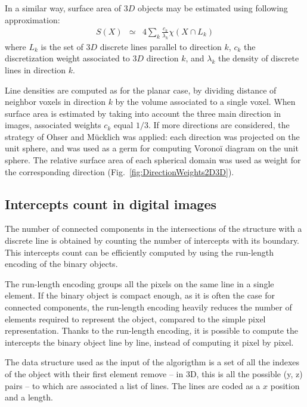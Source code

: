 \documentclass{InsightArticle}
\begin{document}
In a similar way, surface area of $3D$ objects may be estimated using following approximation:
\begin{eqnarray}
S(X) & \simeq & 4\sum_{k}\frac{c_{k}}{\lambda_{k}}\chi \left( X \cap L_{k} \right)
\end{eqnarray}
where $L_k$ is the set of $3D$ discrete lines parallel to direction $k$, 
$c_k$ the discretization weight associated to $3D$ direction $k$, 
and $\lambda_k$ the density of discrete lines in direction $k$.

Line densities are computed as for the planar case, by dividing distance of neighbor
voxels in direction $k$ by the volume associated to a single voxel.
When surface area is estimated by taking into account the three main direction in images, 
associated weights $c_k$ equal $1/3$. If more directions are considered, the strategy of
Ohser and M\"ucklich \cite{Ohser2000} was applied: each direction was projected on the unit sphere, 
and was used as a germ for computing Voronoï diagram on the unit sphere. 
The relative surface area of each spherical domain was used as weight for the
corresponding direction (Fig.~\ref{fig:DirectionWeights2D3D}).

\subsection{Intercepts count in digital images}

The number of connected components in the intersections of the structure with a discrete line
is obtained by counting the number of intercepts with its boundary.
This intercepts count can be efficiently computed by using the run-length
encoding of the binary objects.

The run-length encoding groups all the pixels on the same line in a single element. If the binary object is compact enough, as it is often the case for connected components, the run-length encoding heavily reduces the number of elements required to represent the object, compared to the simple pixel representation. Thanks to the run-length encoding, it is possible to compute the intercepts the binary object line by line, instead of computing it pixel by pixel.

The data structure used as the input of the algorigthm is a set of all the indexes of the object with their first element remove -- in 3D, this is all the possible (y, z) pairs -- to which are associated a list of lines. The lines are coded as a $x$ position and a length.
\end{document}
